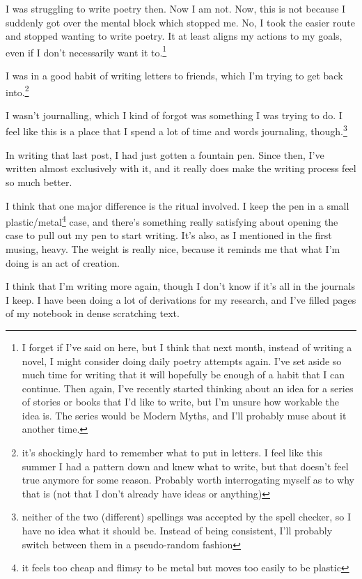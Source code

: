 \documentclass[12pt]{article}[titlepage]
\newcommand{\1}{\={a}}
\newcommand{\2}{\={e}}
\newcommand{\3}{\={\i}}
\newcommand{\4}{\=o}
\newcommand{\5}{\=u}
\newcommand{\6}{\={A}}
\renewcommand{\,}{\textsuperscript{,}}
\begin{document}
I was struggling to write poetry then.
Now I am not.
Now, this is not because I suddenly got over the mental block which stopped me.
No, I took the easier route and stopped wanting to write poetry.
It at least aligns my actions to my goals, even if I don't necessarily want it to.\footnote{I forget if I've said on here, but I think that next month, instead of writing a novel, I might consider doing daily poetry attempts again.
I've set aside so much time for writing that it will hopefully be enough of a habit that I can continue.
Then again, I've recently started thinking about an idea for a series of stories or books that I'd like to write, but I'm unsure how workable the idea is.
The series would be Modern Myths, and I'll probably muse about it another time.}

I was in a good habit of writing letters to friends, which I'm trying to get back into.\footnote{it's shockingly hard to remember what to put in letters.
I feel like this summer I had a pattern down and knew what to write, but that doesn't feel true anymore for some reason.
Probably worth interrogating myself as to why that is (not that I don't already have ideas or anything)}

I wasn't journalling, which I kind of forgot was something I was trying to do.
I feel like this is a place that I spend a lot of time and words journaling, though.\footnote{neither of the two (different) spellings was accepted by the spell checker, so I have no idea what it should be.
Instead of being consistent, I'll probably switch between them in a pseudo-random fashion}

In writing that last post, I had just gotten a fountain pen.
Since then, I've written almost exclusively with it, and it really does make the writing process feel so much better.

I think that one major difference is the ritual involved.
I keep the pen in a small plastic/metal\footnote{it feels too cheap and flimsy to be metal but moves too easily to be plastic} case, and there's something really satisfying about opening the case to pull out my pen to start writing.
It's also, as I mentioned in the first musing, heavy.
The weight is really nice, because it reminds me that what I'm doing is an act of creation.

I think that I'm writing more again, though I don't know if it's all in the journals I keep.
I have been doing a lot of derivations for my research, and I've filled pages of my notebook in dense scratching text.
\end{document}
